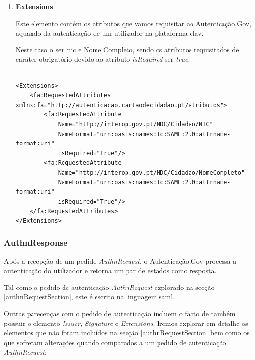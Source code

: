 \begin{enumerate}
    \vspace{-10mm}
    \item \textbf{Extensions}
    
    Este elemento contém os atributos que vamos requisitar ao Autenticação.Gov, aquando da autenticação de um utilizador na plataforma \gls{clav}. 
    
    Neste caso o seu \gls{nic} e Nome Completo, sendo os atributos requisitados de caráter obrigatório devido ao atributo \emph{isRequired} ser \emph{true}.
    
    \begin{lstlisting}
    
<Extensions>
    <fa:RequestedAttributes xmlns:fa="http://autenticacao.cartaodecidadao.pt/atributos">
        <fa:RequestedAttribute 
            Name="http://interop.gov.pt/MDC/Cidadao/NIC" 
            NameFormat="urn:oasis:names:tc:SAML:2.0:attrname-format:uri" 
            isRequired="True"/>
        <fa:RequestedAttribute
            Name="http://interop.gov.pt/MDC/Cidadao/NomeCompleto" 
            NameFormat="urn:oasis:names:tc:SAML:2.0:attrname-format:uri" 
            isRequired="True"/>
    </fa:RequestedAttributes>
</Extensions>
    \end{lstlisting}
\end{enumerate}

\cleardoublepage
\subsubsection{AuthnResponse}

Após a recepção de um pedido \emph{AuthnRequest}, o Autenticação.Gov processa a autenticação do utilizador e retorna um par de estados como resposta.

Tal como o pedido de autenticação \emph{AuthnRequest} explorado na secção \ref{authnRequestSection}, este é escrito na linguagem \gls{saml}.

Outras parecenças com o pedido de autenticação incluem o facto de também possuir o elemento \emph{Issuer}, \emph{Signature} e \emph{Extensions}. Iremos explorar em detalhe os elementos que não foram incluídos na secção \ref{authnRequestSection} bem como os que sofreram alterações quando comparados a um pedido de autenticação \emph{AuthnRequest}:

